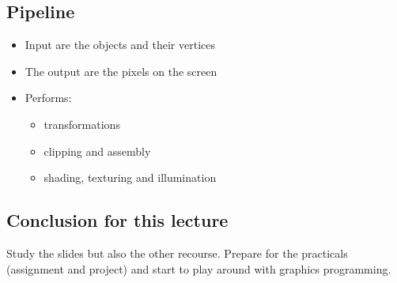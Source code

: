 \subsection*{Pipeline}
\begin{itemize}
	\item Input are the objects and their vertices
	\item The output are the pixels on the screen
	\item Performs:
	\begin{itemize}
		\item transformations
		\item clipping and assembly
		\item shading, texturing and illumination
	\end{itemize}
\end{itemize}

\subsection*{Conclusion for this lecture}
Study the slides but also the other recourse. Prepare for the practicals (assignment and project) and start to play around with graphics programming.   

